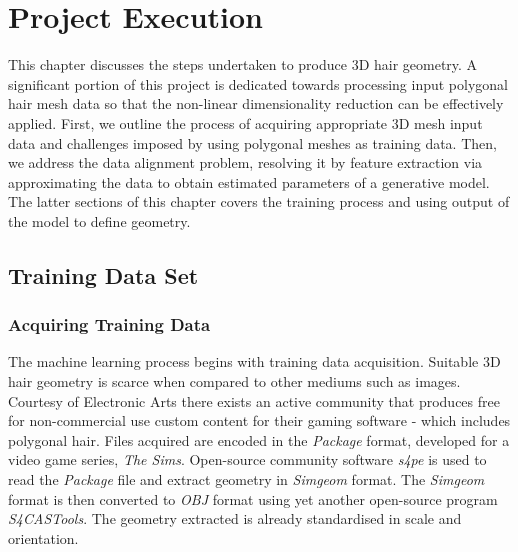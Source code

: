 \documentclass[ %
author={Dillon Keith Diep},
supervisor={Dr. Carl Henrik Ek},
degree={MEng},
title={ART-CG:},
subtitle={Assisted Real-time Content Generation of 3D Hair by Learning Manifolds},
type={Research},
year={2017} ]{dissertation}
\begin{document}

\chapter{Project Execution}
\label{chap:execution}

This chapter discusses the steps undertaken to produce 3D hair geometry. A significant portion of this project is dedicated towards processing input polygonal hair mesh data so that the non-linear dimensionality reduction can be effectively applied. First, we outline the process of acquiring appropriate 3D mesh input data and challenges imposed by using polygonal meshes as training data. Then, we address the data alignment problem, resolving it by feature extraction via approximating the data to obtain estimated parameters of a generative model. The latter sections of this chapter covers the training process and using output of the model to define geometry.

\section{Training Data Set}
\subsection{Acquiring Training Data}
The machine learning process begins with training data acquisition. Suitable 3D hair geometry is scarce when compared to other mediums such as images. Courtesy of Electronic Arts there exists an active community that produces free for non-commercial use custom content for their gaming software - which includes polygonal hair. \cite{tsr} Files acquired are encoded in the \textit{Package} format, developed for a video game series, \textit{The Sims}. Open-source community software \textit{s4pe} is used to read the \textit{Package} file and extract geometry in \textit{Simgeom} format. \cite{s4pe} The \textit{Simgeom} format is then converted to \textit{OBJ} format using yet another open-source program \textit{S4CASTools}. \cite{s4cas} The geometry extracted is already standardised in scale and orientation.
\end{document}
